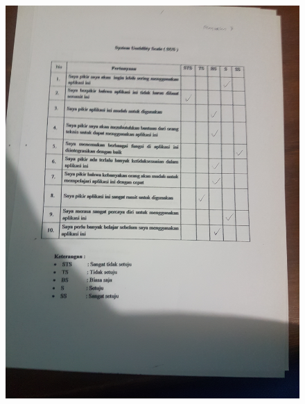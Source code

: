 \begin{figure}[H]
	\center
	\includegraphics [width = 17cm,angle=-90]{gambar/pengujian/pangkalan7}
\end{figure}
